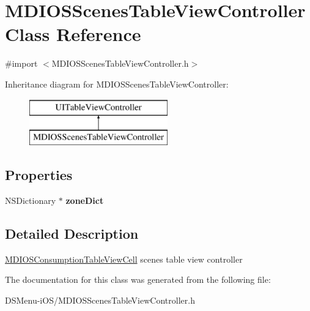 \hypertarget{interface_m_d_i_o_s_scenes_table_view_controller}{\section{M\-D\-I\-O\-S\-Scenes\-Table\-View\-Controller Class Reference}
\label{interface_m_d_i_o_s_scenes_table_view_controller}
}


{\ttfamily \#import $<$M\-D\-I\-O\-S\-Scenes\-Table\-View\-Controller.\-h$>$}

Inheritance diagram for M\-D\-I\-O\-S\-Scenes\-Table\-View\-Controller\-:\begin{figure}[H]
\begin{center}
\leavevmode
\includegraphics[height=2.000000cm]{interface_m_d_i_o_s_scenes_table_view_controller}
\end{center}
\end{figure}
\subsection*{Properties}
\begin{DoxyCompactItemize}
\item 
\hypertarget{interface_m_d_i_o_s_scenes_table_view_controller_ae6a0554972ea2dfab04e678d58104664}{N\-S\-Dictionary $\ast$ {\bfseries zone\-Dict}}\label{interface_m_d_i_o_s_scenes_table_view_controller_ae6a0554972ea2dfab04e678d58104664}

\end{DoxyCompactItemize}


\subsection{Detailed Description}
\hyperlink{interface_m_d_i_o_s_consumption_table_view_cell}{M\-D\-I\-O\-S\-Consumption\-Table\-View\-Cell} scenes table view controller 

The documentation for this class was generated from the following file\-:\begin{DoxyCompactItemize}
\item 
D\-S\-Menu-\/i\-O\-S/M\-D\-I\-O\-S\-Scenes\-Table\-View\-Controller.\-h\end{DoxyCompactItemize}

